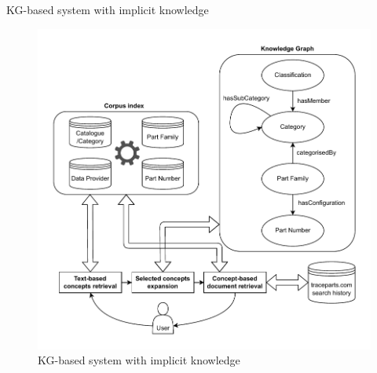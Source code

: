 \begin{frame}{KG-based system with implicit knowledge}

    \begin{figure} [H]
        \begin{center}
            \includegraphics[scale=0.45]{images/tp-expe-kg-based-search-hist-sys.pdf} 
            \caption{KG-based system with implicit knowledge} 
        \end{center}
    \end{figure}

\end{frame}

